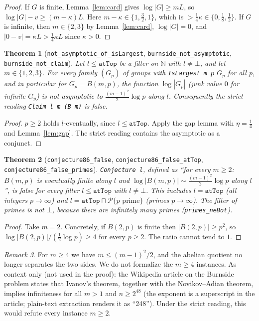 \documentclass[11pt]{article}
\newtheorem{theorem}{Theorem}
\theoremstyle{definition}
\theoremstyle{remark}
\newtheorem{remark}[theorem]{Remark}
\begin{document}
\begin{proof}
If $G$ is finite, Lemma~\ref{lem:card} gives $\log|G|\ge mL$, so
$\log|G|-v\ge(m-\kappa)L$. Here $m-\kappa\in\{1,\frac32,1\}$, which is $>\frac14\kappa\in\{0,\frac18,\frac12\}$.
If $G$ is infinite, then $m\in\{2,3\}$ by Lemma~\ref{lem:card}, $\log|G|=0$, and
$|0-v|=\kappa L>\frac14\kappa L$ since $\kappa>0$.
\end{proof}

\begin{theorem}[\texttt{not\_asymptotic\_of\_isLargest}, \texttt{burnside\_not\_asymptotic},
\texttt{burnside\_not\_claim}]
Let $l\le\texttt{atTop}$ be a filter on $\mathbb{N}$ with $l\ne\bot$, and let $m\in\{1,2,3\}$.
For every family $(G_p)$ of groups with \texttt{IsLargest m p} $G_p$ for all $p$, and in particular
for $G_p=B(m,p)$, the function $\log|G_p|$ (junk value $0$ for infinite $G_p$) is not asymptotic to
$\frac{(m-1)^2}{2}\log p$ along $l$. Consequently the strict reading \texttt{Claim l m (B m)} is
false.
\end{theorem}

\begin{proof}
$p\ge2$ holds $l$-eventually, since $l\le\texttt{atTop}$. Apply the gap lemma with $\eta=\frac14$ and
Lemma~\ref{lem:gap}. The strict reading contains the asymptotic as a conjunct.
\end{proof}

\begin{theorem}[\texttt{conjecture86\_false}, \texttt{conjecture86\_false\_atTop},
\texttt{conjecture86\_false\_primes}]
\texttt{Conjecture l}, defined as ``for every $m\ge2$: $B(m,p)$ is eventually finite along $l$ and
$\log|B(m,p)|\sim\frac{(m-1)^2}{2}\log p$ along $l$'', is false for every filter $l\le\texttt{atTop}$
with $l\ne\bot$. This includes $l=\texttt{atTop}$ (all integers $p\to\infty$) and
$l=\texttt{atTop}\sqcap\mathcal{P}\{p\text{ prime}\}$ (primes $p\to\infty$). The filter of primes is
not $\bot$, because there are infinitely many primes (\texttt{primes\_neBot}).
\end{theorem}

\begin{proof}
Take $m=2$. Concretely, if $B(2,p)$ is finite then $|B(2,p)|\ge p^2$, so
$\log|B(2,p)|/(\frac12\log p)\ge4$ for every $p\ge2$. The ratio cannot tend to $1$.
\end{proof}

\begin{remark}\label{rem:m4}
For $m\ge4$ we have $m\le(m-1)^2/2$, and the abelian quotient no longer separates the two sides.
We do not formalize the $m\ge4$ instances. As context only (not used in the proof): the Wikipedia
article on the Burnside problem states that Ivanov's theorem, together with the Novikov--Adian
theorem, implies infiniteness for all $m>1$ and $n\ge 2^{48}$ (the exponent is a superscript in the
article; plain-text extraction renders it as ``248''). Under the strict reading, this
would refute every instance $m\ge2$.
\end{remark}
\end{document}
